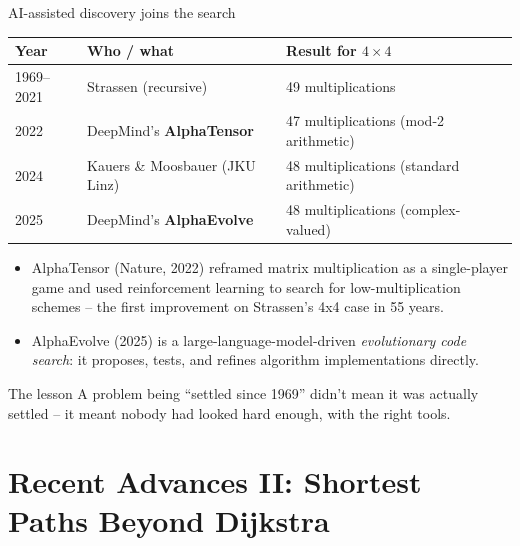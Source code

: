 \documentclass[11pt,aspectratio=169]{beamer}
\begin{document}
\begin{frame}{AI-assisted discovery joins the search}
  \begin{center}
  \begin{tabular}{@{}lll@{}}
    \toprule
    Year & Who / what & Result for $4\times 4$ \\
    \midrule
    1969--2021 & Strassen (recursive) & 49 multiplications \\
    2022 & DeepMind's \textbf{AlphaTensor} & 47 multiplications (mod-2 arithmetic) \\
    2024 & Kauers \& Moosbauer (JKU Linz) & 48 multiplications (standard arithmetic) \\
    2025 & DeepMind's \textbf{AlphaEvolve} & 48 multiplications (complex-valued) \\
    \bottomrule
  \end{tabular}
  \end{center}
  \vspace{0.5em}
  \begin{itemize}
    \item AlphaTensor (Nature, 2022) reframed matrix multiplication as a single-player
    game and used reinforcement learning to search for low-multiplication schemes --
    the first improvement on Strassen's 4x4 case in 55 years.
    \item AlphaEvolve (2025) is a large-language-model-driven \emph{evolutionary code
    search}: it proposes, tests, and refines algorithm implementations directly.
  \end{itemize}
  \begin{alertblock}{The lesson}
    A problem being ``settled since 1969'' didn't mean it was actually settled --
    it meant nobody had looked hard enough, with the right tools.
  \end{alertblock}
\end{frame}

\section{Recent Advances II: Shortest Paths Beyond Dijkstra}
\end{document}
